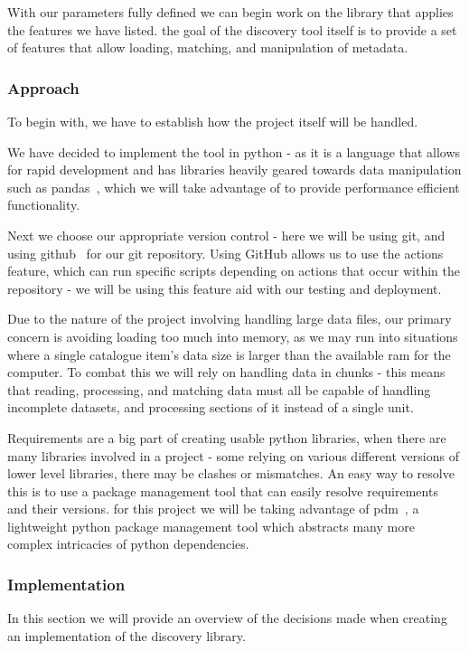 With our parameters fully defined we can begin work on the library that applies the features we have listed.
the goal of the discovery tool itself is to provide a set of features that allow loading, matching, and manipulation
of metadata.

\subsubsection{Approach}
To begin with, we have to establish how the project itself will be handled.

We have decided to implement the tool in python - as it is a language that allows for rapid development and has
libraries heavily geared towards data manipulation such as pandas~\cite{pythonpandas}, which we will take advantage of
to provide performance efficient functionality.

Next we choose our appropriate version control - here we will be using git, and using github~\cite{github} for our git
repository.
Using GitHub allows us to use the actions feature, which can run specific scripts depending on actions that occur within
the repository - we will be using this feature aid with our testing and deployment.

Due to the nature of the project involving handling large data files, our primary concern is avoiding loading too much
into memory, as we may run into situations where a single catalogue item's data size is larger than the available ram
for the computer.
To combat this we will rely on handling data in chunks - this means that reading, processing, and matching data must
all be capable of handling incomplete datasets, and processing sections of it instead of a single unit.

Requirements are a big part of creating usable python libraries, when there are many libraries involved in a project -
some relying on various different versions of lower level libraries, there may be clashes or mismatches.
An easy way to resolve this is to use a package management tool that can easily resolve requirements and their versions.
for this project we will be taking advantage of pdm~\cite{pythonpdm}, a lightweight python package management tool which
abstracts many more complex intricacies of python dependencies.

\subsubsection{Implementation}
In this section we will provide an overview of the decisions made when creating an implementation of the discovery
library.

